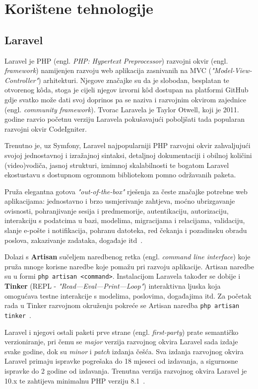 \section{Korištene tehnologije}

\subsection{Laravel}
Laravel je PHP (engl. \textit{PHP: Hypertext Preprocessor}) razvojni okvir (engl. \textit{framework}) namijenjen razvoju web aplikacija zasnivanih na MVC (\textit{"Model-View-Controller"}) arhitekturi. Njegove značajke su da je slobodan, besplatan te otvorenog k\^oda, stoga je cijeli njegov izvorni k\^od dostupan na platformi GitHub~\cite{laravelGitHub} gdje svatko može dati svoj doprinos pa se naziva i razvojnim okvirom zajednice (engl. \textit{community framework}). Tvorac Laravela je Taylor Otwell, koji je 2011. godine razvio početnu verziju Laravela pokušavajući poboljšati tada popularan razvojni okvir CodeIgniter.

Trenutno je, uz Symfony, Laravel najpopularniji PHP razvojni okvir zahvaljujući svojoj jednostavnoj i izražajnoj sintaksi, detaljnoj dokumentaciji i obilnoj količini (video)vodiča, jasnoj strukturi, iznimnoj skalabilnosti te bogatom Laravel ekostustavu s dostupnom ogromnom bibliotekom pomno održavanih paketa.

Pruža elegantna gotova \textit{"out-of-the-box"} rješenja za česte značajke potrebne web aplikacijama: jednostavno i brzo usmjerivanje zahtjeva, moćno ubrizgavanje ovisnosti, pohranjivanje sesija i predmemorije, autentikaciju, autorizaciju, interakciju s podatcima u bazi, modelima, migracijama i relacijama, validaciju, slanje e-pošte i notifikacija, pohranu datoteka, red čekanja i pozadinsku obradu poslova, zakazivanje zadataka, događaje itd~\cite{laravel}.

Dolazi s \textbf{Artisan} sučeljem naredbenog retka (engl. \textit{command line interface}) koje pruža mnoge korisne naredbe koje pomažu pri razvoju aplikacije. Artisan naredbe su u formi \texttt{php artisan <command>}. Instalacijom Laravela također se dobije i \textbf{Tinker} (REPL - \textit{"Read—Eval—Print—Loop"}) interaktivna ljuska koja omogućava testne interakcije s modelima, poslovima, događajima itd. Za početak rada u Tinker razvojnom okruženju pokreće se Artisan naredba \texttt{php artisan tinker}~\cite{artisanConsole}.

Laravel i njegovi ostali paketi prve strane (engl. \textit{first-party}) prate semantičko verzioniranje, pri čemu se \textit{major} verzija razvojnog okvira Laravel sada izdaje svake godine, dok su \textit{minor} i \textit{patch} izdanja češća. Sva izdanja razvojnog okvira Laravel primaju ispravke pogrešaka do 18 mjeseci od izdavanja, a sigurnosne ispravke do 2 godine od izdavanja.
Trenutna verzija razvojnog okvira Laravel je 10.x te zahtijeva minimalnu PHP verziju 8.1~\cite{releaseNotes}. 
 
